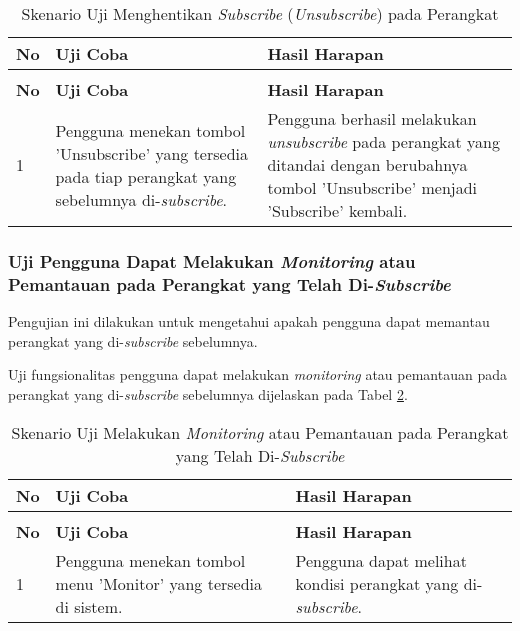 \begin{longtable}{|p{}|p{}|p{}|}					\caption{Skenario Uji Pengguna Dapat Menghentikan \textit{Subscribe} (\textit{Unsubscribe}) pada Perangkat} \label{usubscribe} \\
	\hline
	\textbf{No} & \textbf{Uji Coba} & \textbf{Hasil Harapan} \\ \hline
	\endfirsthead
	\caption[]{Skenario Uji Menghentikan \textit{Subscribe} (\textit{Unsubscribe}) pada Perangkat} \\
	\hline
	\textbf{No} & \textbf{Uji Coba} & \textbf{Hasil Harapan} \\ \hline
	\endhead
	\endfoot
	\endlastfoot
	
	1 & Pengguna menekan tombol 'Unsubscribe' yang tersedia pada tiap perangkat yang sebelumnya di-\textit{subscribe}. & Pengguna berhasil melakukan \textit{unsubscribe} pada perangkat yang ditandai dengan berubahnya tombol 'Unsubscribe' menjadi 'Subscribe' kembali.\\ \hline
\end{longtable}

\subsubsection{Uji Pengguna Dapat Melakukan \textit{Monitoring} atau Pemantauan pada Perangkat yang Telah Di-\textit{Subscribe}} \label{ketujuh}
Pengujian ini dilakukan untuk mengetahui apakah pengguna dapat memantau perangkat yang di-\textit{subscribe} sebelumnya. 

Uji fungsionalitas pengguna dapat melakukan \textit{monitoring} atau pemantauan pada perangkat yang di-\textit{subscribe} sebelumnya dijelaskan pada Tabel \ref{monitor}.

\begin{longtable}{|p{}|p{}|p{}|}					\caption{Skenario Uji Pengguna Dapat Melakukan \textit{Monitoring} atau Pemantauan pada Perangkat yang Telah Di-\textit{Subscribe}} \label{monitor} \\
	\hline
	\textbf{No} & \textbf{Uji Coba} & \textbf{Hasil Harapan} \\ \hline
	\endfirsthead
	\caption[]{Skenario Uji Melakukan \textit{Monitoring} atau Pemantauan pada Perangkat yang Telah Di-\textit{Subscribe}} \\
	\hline
	\textbf{No} & \textbf{Uji Coba} & \textbf{Hasil Harapan} \\ \hline
	\endhead
	\endfoot
	\endlastfoot
	
	1 & Pengguna menekan tombol menu 'Monitor' yang tersedia di sistem. & Pengguna dapat melihat kondisi perangkat yang di-\textit{subscribe}.\\ \hline
\end{longtable}

